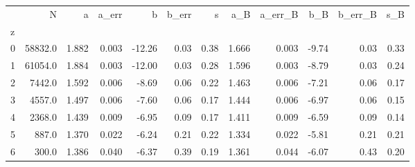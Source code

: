 \begin{tabular}{lrrrrrrrrrrr}
\toprule
{} &        N &      a &  a\_err &      b &  b\_err &     s &    a\_B &  a\_err\_B &   b\_B &  b\_err\_B &   s\_B \\
z &          &        &        &        &        &       &        &          &       &          &       \\
\midrule
0 &  58832.0 &  1.882 &  0.003 & -12.26 &   0.03 &  0.38 &  1.666 &    0.003 & -9.74 &     0.03 &  0.33 \\
1 &  61054.0 &  1.884 &  0.003 & -12.00 &   0.03 &  0.28 &  1.596 &    0.003 & -8.79 &     0.03 &  0.24 \\
2 &   7442.0 &  1.592 &  0.006 &  -8.69 &   0.06 &  0.22 &  1.463 &    0.006 & -7.21 &     0.06 &  0.17 \\
3 &   4557.0 &  1.497 &  0.006 &  -7.60 &   0.06 &  0.17 &  1.444 &    0.006 & -6.97 &     0.06 &  0.15 \\
4 &   2368.0 &  1.439 &  0.009 &  -6.95 &   0.09 &  0.17 &  1.411 &    0.009 & -6.59 &     0.09 &  0.14 \\
5 &    887.0 &  1.370 &  0.022 &  -6.24 &   0.21 &  0.22 &  1.334 &    0.022 & -5.81 &     0.21 &  0.21 \\
6 &    300.0 &  1.386 &  0.040 &  -6.37 &   0.39 &  0.19 &  1.361 &    0.044 & -6.07 &     0.43 &  0.20 \\
\bottomrule
\end{tabular}
